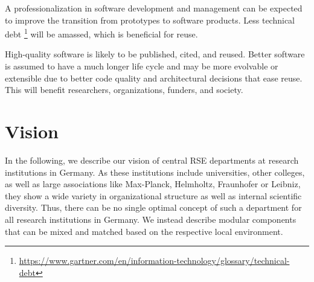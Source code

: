 \documentclass[a4paper]{article}
\begin{document}

A professionalization in software development and management can be expected to improve the transition from prototypes to software products.%
Less technical debt \footnote{\url{https://www.gartner.com/en/information-technology/glossary/technical-debt}} will be amassed, which is beneficial for reuse.

High-quality software is likely to be published, cited, and reused.
Better software is assumed to have a much longer life cycle and may be more evolvable or extensible due to better code quality and architectural decisions that ease reuse.
This will benefit researchers, organizations, funders, and society.







\section{Vision}
\label{sec:vision}
In the following, we describe our vision of central RSE departments at research institutions in Germany.
As these institutions include universities, other colleges, as well as large associations like Max-Planck, Helmholtz, Fraunhofer or Leibniz,
they show a wide variety in organizational structure as well as internal scientific diversity.
Thus, there can be no single optimal concept of such a department for all research institutions in Germany.
We instead describe modular components that can be mixed and matched based on the respective local environment.
\end{document}
